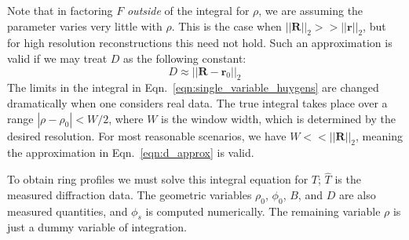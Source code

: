 \documentclass{article}
\begin{document}
        Note that in factoring $F$ \textit{outside} of the integral for
        $\rho$, we are assuming the parameter varies very little with $\rho$.
        This is the case when $||\mathbf{R}||_{2}>>||\mathbf{r}||_{2}$, but
        for high resolution reconstructions this need not hold.
        Such an approximation is valid if we may
        treat $D$ as the following constant:
        \begin{equation}
            \label{eqn:d_approx}
            D\approx||\mathbf{R}-\mathbf{r}_{0}||_{2}
        \end{equation}
        The limits in the integral in Eqn.~\ref{eqn:single_variable_huygens}
        are changed dramatically when one considers real data. The true
        integral takes place over a range $|\rho-\rho_{0}|<W/2$, where $W$ is
        the window width, which is determined by the desired resolution.
        For most reasonable scenarios, we have $W<<||\mathbf{R}||_{2}$,
        meaning the approximation in Eqn.~\ref{eqn:d_approx} is valid.
        \par\hfill\par
        To obtain ring profiles we must solve this integral equation for $T$;
        $\hat{T}$ is the measured diffraction data.
        The geometric variables $\rho_{0}$, $\phi_{0}$, $B$, and $D$ are also
        measured quantities, and $\phi_{s}$ is computed numerically.
        The remaining variable $\rho$ is just a dummy variable of integration.
\end{document}

